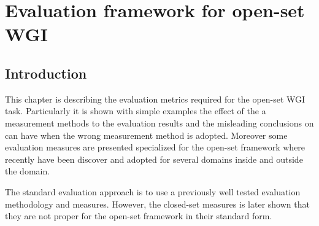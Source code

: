 
\chapter{Evaluation framework for open-set WGI}

\label{chap:eval_methods}


\newcommand{\keyword}[1]{\textbf{#1}}
\newcommand{\tabhead}[1]{\textbf{#1}}
\newcommand{\code}[1]{\texttt{#1}}
\newcommand{\file}[1]{\texttt{\bfseries#1}}
\newcommand{\option}[1]{\texttt{\itshape#1}}


\section{Introduction}\label{chap:eval_methods:sec:intro}

This chapter is describing the evaluation metrics required for the open-set WGI task. Particularly it is shown with simple examples the effect of the a measurement methods to the evaluation results and the misleading conclusions on can have when the wrong measurement method is adopted. Moreover some evaluation measures are presented specialized for the open-set framework where recently have been discover and adopted for several domains inside and outside the  domain.

The standard evaluation approach is to use a previously well tested evaluation methodology and measures. However, the closed-set measures is later shown that they are not proper for the open-set framework in their standard form. 

